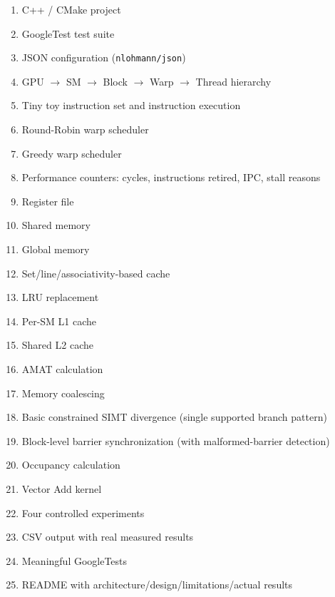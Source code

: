 \documentclass[11pt]{article}
\begin{document}
\begin{enumerate}[leftmargin=1.2cm]
  \item C++ / CMake project
  \item GoogleTest test suite
  \item JSON configuration (\texttt{nlohmann/json})
  \item GPU $\rightarrow$ SM $\rightarrow$ Block $\rightarrow$ Warp
  $\rightarrow$ Thread hierarchy
  \item Tiny toy instruction set and instruction execution
  \item Round-Robin warp scheduler
  \item Greedy warp scheduler
  \item Performance counters: cycles, instructions retired, IPC, stall
  reasons
  \item Register file
  \item Shared memory
  \item Global memory
  \item Set/line/associativity-based cache
  \item LRU replacement
  \item Per-SM L1 cache
  \item Shared L2 cache
  \item AMAT calculation
  \item Memory coalescing
  \item Basic constrained SIMT divergence (single supported branch
  pattern)
  \item Block-level barrier synchronization (with malformed-barrier
  detection)
  \item Occupancy calculation
  \item Vector Add kernel
  \item Four controlled experiments
  \item CSV output with real measured results
  \item Meaningful GoogleTests
  \item README with architecture/design/limitations/actual results
\end{enumerate}

\begin{center}
\end{center}
\end{document}
